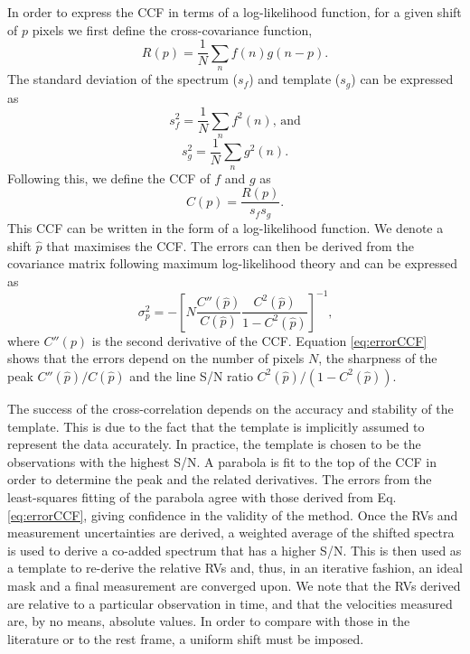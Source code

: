 In order to express the CCF in terms of a log-likelihood function, for a given shift of $p$ pixels we first define the cross-covariance function,
\begin{equation}
R(p) =\frac{1}{N}\sum_n f(n) g(n-p)\textrm{.}
\end{equation}
The standard deviation of the spectrum ($s_f$) and template ($s_g$) can be expressed as 
\begin{equation}
s_f^2 = \frac{1}{N} \sum_n f^2 (n) \textrm{, and}
\end{equation}
\begin{equation}
s_g^2 = \frac{1}{N} \sum_n g^2 (n) \textrm{.}
\end{equation}
Following this, we define the CCF of $f$ and $g$ as
\begin{equation}
C(p) = \frac{R(p)}{s_f s_g} \textrm{.}
\end{equation}
This CCF can be written in the form of a log-likelihood function. We denote a shift $\hat{p}$ that maximises the CCF. The errors can then be derived from the covariance matrix following maximum log-likelihood theory and can be expressed as
\begin{equation}
\sigma_p^2 = - \left[N \frac{C''(\hat{p})}{C(\hat{p})} \frac{C^2(\hat{p})}{1 - C^2(\hat{p})} \right]^{-1} \textrm{,}
\label{eq:errorCCF}
\end{equation}
where $C''(p)$ is the second derivative of the CCF. Equation \ref{eq:errorCCF} shows that the errors depend on the number of pixels $N$, the sharpness of the peak $C''(\hat{p}) / C(\hat{p})$ and the line S/N ratio $C^2(\hat{p}) / (1 - C^2(\hat{p}))$. 

The success of the cross-correlation depends on the accuracy and stability of the template. This is due to the fact that the template is implicitly assumed to represent the data accurately. In practice, the template is chosen to be the observations with the highest S/N. A parabola is fit to the top of the CCF in order to determine the peak and the related derivatives. The errors from the least-squares fitting of the parabola agree with those derived from Eq. \ref{eq:errorCCF}, giving confidence in the validity of the method. Once the RVs and measurement uncertainties are derived, a weighted average of the shifted spectra is used to derive a co-added spectrum that has a higher S/N. This is then used as a template to re-derive the relative RVs and, thus, in an iterative fashion, an ideal mask and a final measurement are converged upon. We note that the RVs derived are relative to a particular observation in time, and that the velocities measured are, by no means, absolute values. In order to compare with those in the literature or to the rest frame, a uniform shift must be imposed. 


